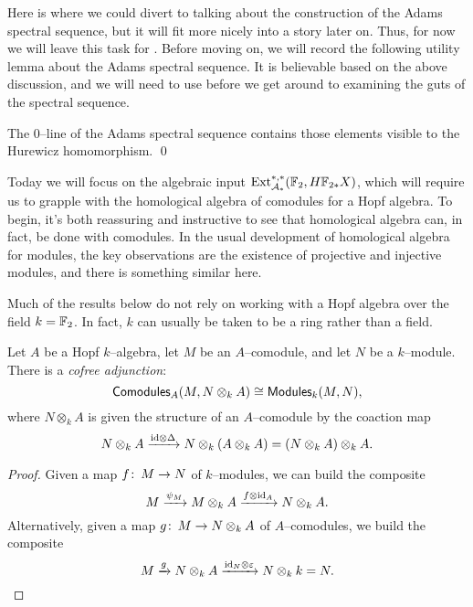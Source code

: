 Here is where we could divert to talking about the construction of the Adams spectral sequence, but it will fit more nicely into a story later on.  Thus, for now we will leave this task for .  Before moving on, we will record the following utility lemma about the Adams spectral sequence.  It is believable based on the above discussion, and we will need to use before we get around to examining the guts of the spectral sequence.
\begin{lemma}\label{HurewiczImageOnZeroLine}
The $0$--line of the Adams spectral sequence contains those elements visible to the Hurewicz homomorphism. \qed {}
\end{lemma}

Today we will focus on the algebraic input $\operatorname{Ext}_{\mathcal A_*}^{*, *}(\mathbb F_2, H\mathbb F_{2*} X)$, which will require us to grapple with the homological algebra of comodules for a Hopf algebra.  To begin, it's both reassuring and instructive to see that homological algebra can, in fact, be done with comodules.  In the usual development of homological algebra for modules, the key observations are the existence of projective and injective modules, and there is something similar here.

\begin{remark}
Much of the results below do not rely on working with a Hopf algebra over the field $k = \mathbb F_2$.  In fact, $k$ can usually be taken to be a ring rather than a field.
\end{remark}

\begin{lemma}
Let $A$ be a Hopf $k$--algebra, let $M$ be an $A$--comodule, and let $N$ be a $k$--module.  There is a \textit{cofree adjunction}: \[\mathsf{Comodules}_A(M, N \otimes_k A) \cong \mathsf{Modules}_k(M, N),\] where $N \otimes_k A$ is given the structure of an $A$--comodule by the coaction map \[N \otimes_k A \xrightarrow{\mathrm{id} \otimes \Delta} N \otimes_k (A \otimes_k A) = (N \otimes_k A) \otimes_k A.\]
\end{lemma}
\begin{proof}
Given a map $f\colon\thinspace M \to N$ of $k$--modules, we can build the composite \[M \xrightarrow{\psi_M} M \otimes_k A \xrightarrow{f \otimes \mathrm{id}_A} N \otimes_k A.\]  Alternatively, given a map $g\colon\thinspace M \to N \otimes_k A$ of $A$--comodules, we build the composite \[M \xrightarrow{g} N \otimes_k A \xrightarrow{\mathrm{id}_N \otimes \varepsilon} N \otimes_k k = N. \qedhere\]
\end{proof}

